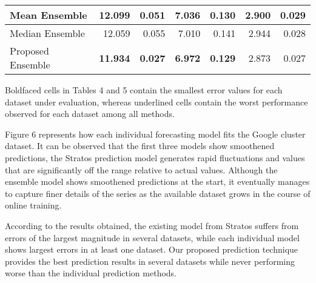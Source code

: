 \begin{table}[]
\begin{tabular}{|l|r|r|r|r|r|r|}
Mean Ensemble                                      & 12.099              & 0.051               & 7.036               & 0.130               & 2.900               & 0.029            \\ \hline
Median Ensemble                                      &  12.059              & 0.055               &  7.010               & 0.141               & 2.944               & 0.028            \\ \hline

Proposed Ensemble                                     & \textbf{11.934}           & \textbf{0.027}            & \textbf{6.972}            & \textbf{0.129}            & 2.873                     & 0.027                     \\ \hline
\end{tabular}
\end{table}

Boldfaced cells in Tables 4 and 5 contain the smallest error values for each dataset under evaluation, whereas underlined cells contain the worst performance observed for each dataset among all methods.

Figure 6 represents how each individual forecasting model fits the Google cluster dataset. It can be observed that the first three models show smoothened predictions, the Stratos prediction model generates rapid fluctuations and values that are significantly off the range relative to actual values. Although the ensemble model shows smoothened predictions at the start, it eventually manages to capture finer details of the series as the available dataset grows in the course of online training.

According to the results obtained, the existing model from Stratos suffers from errors of the largest magnitude in several datasets, while each individual model shows largest errors in at least one dataset. Our proposed prediction technique provides the best prediction results in several datasets while never performing worse than the individual prediction methods.